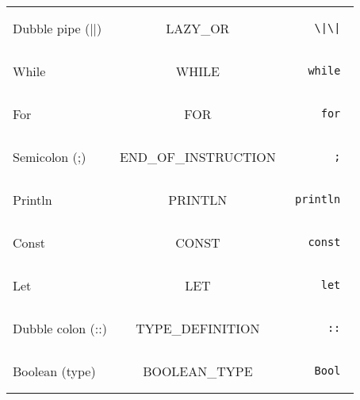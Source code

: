 \documentclass[a4paper,10pt]{article}
\begin{document}
\begin{tabular}{|l|c|r|}
  Dubble pipe (||) & LAZY\_OR & \begin{minipage}{2in} \begin{verbatim} \|\| \end{verbatim} \end{minipage} \\
  While & WHILE & \begin{minipage}{2in} \begin{verbatim} while \end{verbatim} \end{minipage} \\
  For & FOR & \begin{minipage}{2in} \begin{verbatim} for \end{verbatim} \end{minipage} \\
  Semicolon (;) & END\_OF\_INSTRUCTION & \begin{minipage}{2in} \begin{verbatim} ; \end{verbatim} \end{minipage} \\
  Println & PRINTLN & \begin{minipage}{2in} \begin{verbatim} println \end{verbatim} \end{minipage} \\
  Const & CONST & \begin{minipage}{2in} \begin{verbatim} const \end{verbatim} \end{minipage} \\
  Let & LET & \begin{minipage}{2in} \begin{verbatim} let \end{verbatim} \end{minipage} \\
  Dubble colon (::) & TYPE\_DEFINITION & \begin{minipage}{2in} \begin{verbatim} :: \end{verbatim} \end{minipage} \\
  Boolean (type)  & BOOLEAN\_TYPE & \begin{minipage}{2in} \begin{verbatim} Bool \end{verbatim} \end{minipage} \\

\end{tabular}
\end{document}
